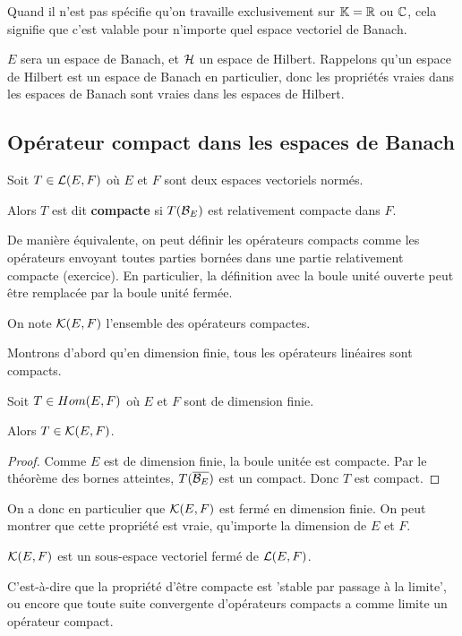 Quand il n'est pas spécifie qu'on travaille exclusivement sur $\mathbb{K} =
\mathbb{R}$ ou $\mathbb{C}$, cela signifie que c'est valable pour n'importe quel espace
vectoriel de Banach.

$E$ sera un espace de Banach, et $\mathcal{H}$ un espace de Hilbert.  Rappelons
qu'un espace de Hilbert est un espace de Banach en particulier, donc les
propriétés vraies dans les espaces de Banach sont vraies dans les espaces de
Hilbert.

\subsection{Opérateur compact dans les espaces de Banach}

\begin{definition}
	Soit $T \in \mathcal{L}(E, F)$ où $E$ et $F$ sont deux espaces
	vectoriels normés.

	Alors $T$ est dit \textbf{compacte} si $T(\mathcal{B}_{E})$ est relativement compacte
	dans $F$.
\end{definition}

De manière équivalente, on peut définir les opérateurs compacts comme les
opérateurs envoyant toutes parties bornées dans une partie relativement
compacte (exercice).
En particulier, la définition avec la boule unité ouverte peut
être remplacée par la boule unité fermée.

On note $\mathcal{K}(E, F)$ l'ensemble des opérateurs compactes.

Montrons d'abord qu'en dimension finie, tous les opérateurs linéaires sont
compacts.

\begin{proposition}
	Soit $T \in Hom(E, F)$ où $E$ et $F$ sont de dimension finie.

	Alors $T \in \mathcal{K}(E, F)$.
\end{proposition}

\begin{proof}
	Comme $E$ est de dimension finie, la boule unitée est compacte. Par le
	théorème des bornes atteintes, $T(\overline{\mathcal{B}_{E}})$ est un compact.
	Donc $T$ est compact.
\end{proof}

On a donc en particulier que $\mathcal{K}(E, F)$ est fermé en dimension
finie. On peut montrer que cette propriété est vraie, qu'importe la dimension de
$E$ et $F$.

\begin{proposition}
	$\mathcal{K}(E, F)$ est un sous-espace vectoriel fermé de
	$\mathcal{L}(E, F)$.

	C'est-à-dire que la propriété d'être compacte est 'stable par passage à la
	limite', ou encore que toute suite convergente d'opérateurs compacts a
	comme limite un opérateur compact.
\end{proposition}

